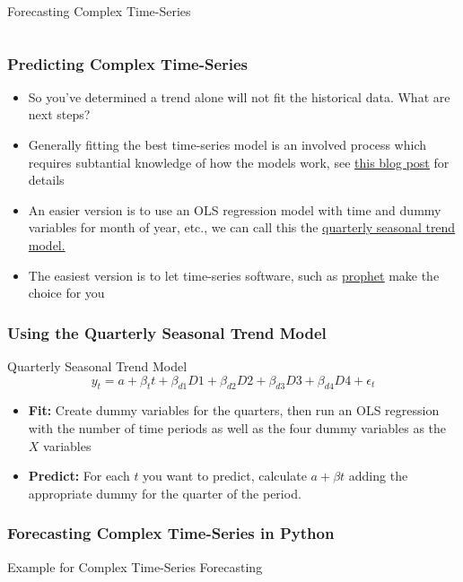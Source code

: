 \documentclass[handout, 11pt]{beamer}
\begin{document}
\begin{section}{Forecasting Complex Time-Series}
\begin{frame}
\begin{columns}
\end{columns}
\end{frame}
\begin{frame}
\frametitle{Predicting Complex Time-Series}
\begin{itemize}
\item So you've determined a trend alone will not fit the historical data. What are next steps?
\vfill
\item Generally fitting the best time-series model is an involved process which requires subtantial knowledge of how the models work, see
\textcolor{blue}{\underline{\href{https://www.seanabu.com/2016/03/22/time-series-seasonal-ARIMA-model-in-python/}{this blog post}}}
for details
\vfill
\item An easier version is to use an OLS regression model with time and dummy variables for month of year, etc., we can call this the 
\underline{quarterly seasonal trend model.}
\vfill
\item The easiest version is to let time-series software, such as
\textcolor{blue}{\underline{\href{https://facebook.github.io/prophet/docs/quick\_start.html}{prophet}}}
make the choice for you
\end{itemize}
\end{frame}
\begin{frame}
\frametitle{Using the Quarterly Seasonal Trend Model}
\begin{block}{Quarterly Seasonal Trend Model}
\begin{equation}
	y_t = a + \beta_t t + \beta_{d1} D1 + \beta_{d2} D2 + \beta_{d3} D3 + \beta_{d4} D4  + \epsilon_t
\end{equation}
\end{block}
\vfill
\begin{itemize}
\item \textbf{Fit:}
Create dummy variables for the quarters, then run an OLS regression with the number of time periods as well as the four dummy variables as the $X$ variables
\vfill
\item \textbf{Predict:}
For each $t$ you want to predict, calculate $a + \beta t$ adding the appropriate dummy for the quarter of the period.
\end{itemize}
\end{frame}
\begin{frame}
\frametitle{Forecasting Complex Time-Series in Python}
{
\begin{block}{Example for Complex Time-Series Forecasting}
\begin{itemize}

\end{itemize}
\end{block}}
\end{frame}
\end{section}
\end{document}
